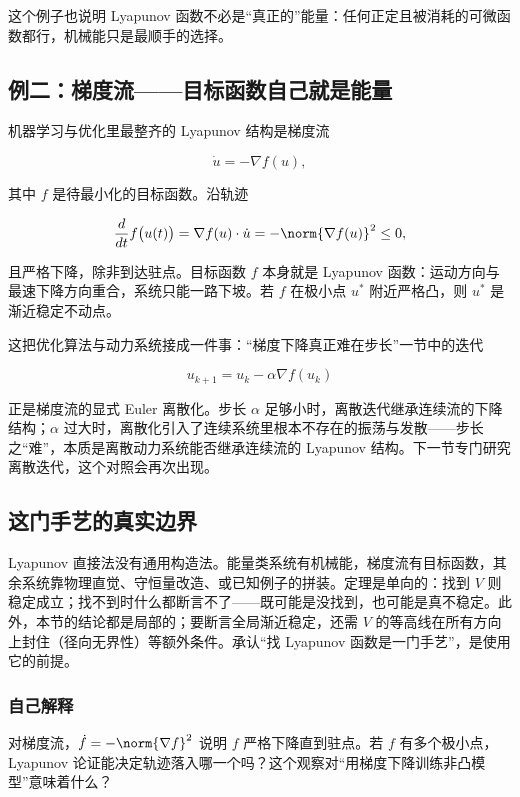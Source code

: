 这个例子也说明 Lyapunov 函数不必是``真正的''能量：任何正定且被消耗的可微函数都行，机械能只是最顺手的选择。

\subsection{例二：梯度流——目标函数自己就是能量}

机器学习与优化里最整齐的 Lyapunov 结构是梯度流

\[
\dot u=-\nabla f(u),
\]

其中 \(f\) 是待最小化的目标函数。沿轨迹

\[
\frac{d}{dt}f\bigl(u(t)\bigr)
=\nabla f(u)\cdot\dot u
=-\norm{\nabla f(u)}^2\le0,
\]

且严格下降，除非到达驻点。目标函数 \(f\) 本身就是 Lyapunov 函数：运动方向与最速下降方向重合，系统只能一路下坡。若 \(f\) 在极小点 \(u^\ast\) 附近严格凸，则 \(u^\ast\) 是渐近稳定不动点。

这把优化算法与动力系统接成一件事：``梯度下降真正难在步长''一节中的迭代

\[
u_{k+1}=u_k-\alpha\nabla f(u_k)
\]

正是梯度流的显式 Euler 离散化。步长 \(\alpha\) 足够小时，离散迭代继承连续流的下降结构；\(\alpha\) 过大时，离散化引入了连续系统里根本不存在的振荡与发散——步长之``难''，本质是离散动力系统能否继承连续流的 Lyapunov 结构。下一节专门研究离散迭代，这个对照会再次出现。

\subsection{这门手艺的真实边界}

Lyapunov 直接法没有通用构造法。能量类系统有机械能，梯度流有目标函数，其余系统靠物理直觉、守恒量改造、或已知例子的拼装。定理是单向的：找到 \(V\) 则稳定成立；找不到时什么都断言不了——既可能是没找到，也可能是真不稳定。此外，本节的结论都是局部的；要断言全局渐近稳定，还需 \(V\) 的等高线在所有方向上封住（径向无界性）等额外条件。承认``找 Lyapunov 函数是一门手艺''，是使用它的前提。

\subsubsection{自己解释}

对梯度流，\(\dot f=-\norm{\nabla f}^2\) 说明 \(f\) 严格下降直到驻点。若 \(f\) 有多个极小点，Lyapunov 论证能决定轨迹落入哪一个吗？这个观察对``用梯度下降训练非凸模型''意味着什么？
